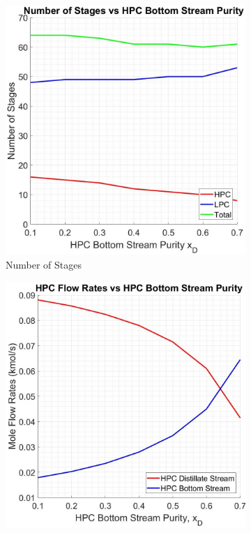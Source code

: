     \begin{figure}[ht]
        \centering
        \begin{subfigure}{0.49\textwidth}
            \includegraphics[width=\linewidth]{airseparation/graphics/graph-stages_vs_HPCxB.jpg}
            \caption{Number of Stages} \label{fig:optimisation_2a}
        \end{subfigure}
        \hspace*{\fill} %
        \begin{subfigure}{0.49\textwidth}
            \includegraphics[width=\linewidth]{airseparation/graphics/graph-flowrate_vs_HPCxB.jpg}

\end{subfigure}
\end{figure}
